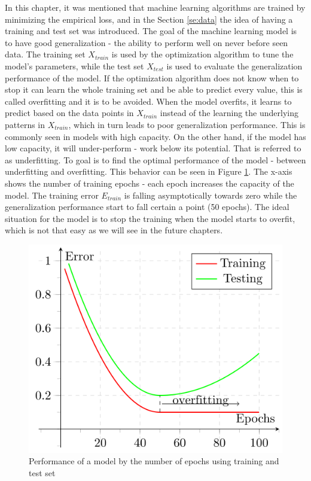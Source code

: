 \documentclass[times, utf8, diplomski]{fer}
\begin{document}
In this chapter, it was mentioned that machine learning algorithms are trained by minimizing the empirical loss, and in the Section \ref{se:data} the idea of having a training and test set was introduced. The goal of the machine learning model is to have good generalization - the ability to perform well on never before seen data. The training set $X_{train}$ is used by the optimization algorithm to tune the model's parameters, while the test set $X_{test}$ is used to evaluate the generalization performance of the model. If the optimization algorithm does not know when to stop it can learn the whole training set and be able to predict every value, this is called overfitting and it is to be avoided. When the model overfits, it learns to predict based on the data points in $X_{train}$ instead of the learning the underlying patterns in $X_{train}$, which in turn leads to poor generalization performance. This is commonly seen in models with high capacity. On the other hand, if the model has low capacity, it will under-perform - work below its potential. That is referred to as underfitting. To goal is to find the optimal performance of the model - between underfitting and overfitting. This behavior can be seen in Figure \ref{fig:overfitting}. The x-axis shows the number of training epochs - each epoch increases the capacity of the model. The training error $E_{train}$ is falling asymptotically towards zero while the generalization performance start to fall certain a point (50 epochs). The ideal situation for the model is to stop the training when the model starts to overfit, which is not that easy as we will see in the future chapters.


\begin{figure}
  \includegraphics[scale=0.43]{figures/overfitting.png}
  \centering
  \caption{Performance of a model by the number of epochs using training and test set}
  \label{fig:overfitting}
\end{figure}
\end{document}
